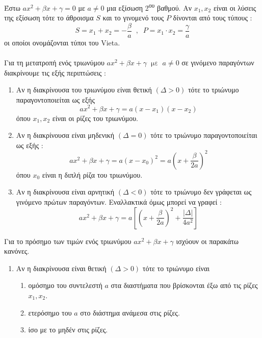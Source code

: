 Έστω $ ax^2+\beta x+\gamma=0 $ με $ a\neq0 $ μια εξίσωση 2\textsuperscript{ου} βαθμού. Αν $ x_1,x_2 $ είναι οι λύσεις της εξίσωση τότε το άθροισμα $ S $ και το γινομενό τους $ P $ δίνονται από τους τύπους :
\[ S=x_1+x_2=-\dfrac{\beta}{a}\;\;,\;\;P=x_1\cdot x_2=\dfrac{\gamma}{a} \]
οι οποίοι ονομάζονται τύποι του Vieta.\\\\
Για τη μετατροπή ενός τριωνύμου $ ax^2+\beta x+\gamma\;\;\textrm{με}\;\;a\neq0 $ σε γινόμενο παραγόντων διακρίνουμε τις εξής περιπτώσεις :
\begin{enumerate}[itemsep=0mm]
\item Αν η διακρίνουσα του τριωνύμου είναι θετική $\left( \varDelta>0\right)  $ τότε το τριώνυμο παραγοντοποιείται ως εξής \[ ax^2+\beta x+\gamma=a(x-x_1)(x-x_2) \]
όπου $ x_1,x_2 $ είναι οι ρίζες του τριωνύμου.
\item Αν η διακρίνουσα είναι μηδενική $\left( \varDelta=0\right)  $ τότε το τριώνυμο παραγοντοποιείται ως εξής : \[ ax^2+\beta x+\gamma=a\left(x-x_0\right)^2=a\left(x+\frac{\beta}{2a}\right)^2  \]
όπου $ x_0 $ είναι η διπλή ρίζα του τριωνύμου.
\item Αν η διακρίνουσα είναι αρνητική $\left( \varDelta<0\right)  $ τότε το τριώνυμο δεν γράφεται ως γινόμενο πρώτων παραγόντων. Εναλλακτικά όμως μπορεί να γραφεί : \[ ax^2+\beta x+\gamma=a\left[\left(x+\frac{\beta}{2a}\right)^2+\frac{|\varDelta|}{4a^2}\right]  \]
\end{enumerate}
Για το πρόσημο των τιμών ενός τριωνύμου $ ax^2+\beta x+\gamma $ ισχύουν οι παρακάτω κανόνες.
\begin{enumerate}[itemsep=0mm]
\item Αν η διακρίνουσα είναι θετική $\left( \varDelta>0\right)  $ τότε το τριώνυμο είναι
\begin{enumerate}[itemsep=0mm,label=\roman*.]
\item ομόσημο του συντελεστή $ a $ στα διαστήματα που βρίσκονται έξω από τις ρίζες $ x_1,x_2 $.
\item ετερόσημο του $ a $ στο διάστημα ανάμεσα στις ρίζες.
\item ίσο με το μηδέν στις ρίζες.
\end{enumerate}
\end{enumerate}
\begin{center}
\end{center}
